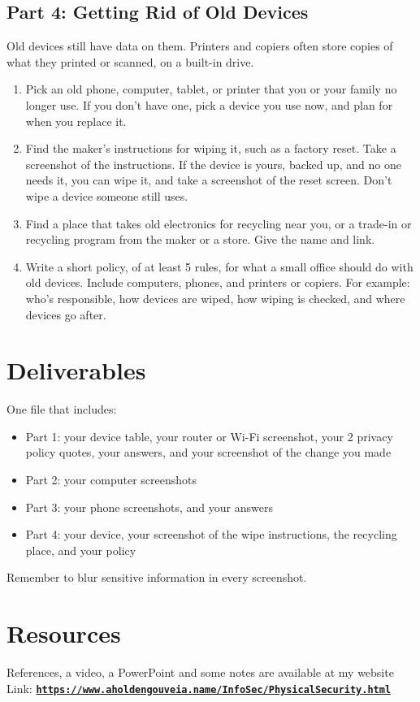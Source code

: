 \documentclass[12pt]{article}
\begin{document}
\subsection*{Part 4: Getting Rid of Old Devices}
Old devices still have data on them. Printers and copiers often store copies of what they printed or scanned, on a built-in drive.
\begin{enumerate}[start=9]
    \item Pick an old phone, computer, tablet, or printer that you or your family no longer use. If you don't have one, pick a device you use now, and plan for when you replace it.
    \item Find the maker's instructions for wiping it, such as a factory reset. Take a screenshot of the instructions. If the device is yours, backed up, and no one needs it, you can wipe it, and take a screenshot of the reset screen. Don't wipe a device someone still uses.
    \item Find a place that takes old electronics for recycling near you, or a trade-in or recycling program from the maker or a store. Give the name and link.
    \item Write a short policy, of at least 5 rules, for what a small office should do with old devices. Include computers, phones, and printers or copiers. For example: who's responsible, how devices are wiped, how wiping is checked, and where devices go after.
\end{enumerate}

\section*{Deliverables}
One file that includes:
\begin{itemize}
    \item Part 1: your device table, your router or Wi-Fi screenshot, your 2 privacy policy quotes, your answers, and your screenshot of the change you made
    \item Part 2: your computer screenshots
    \item Part 3: your phone screenshots, and your answers
    \item Part 4: your device, your screenshot of the wipe instructions, the recycling place, and your policy
\end{itemize}
Remember to blur sensitive information in every screenshot.

\section*{Resources}
References, a video, a PowerPoint and some notes are available at my website
Link: \href{https://www.aholdengouveia.name/InfoSec/PhysicalSecurity.html}{\textbf{\nolinkurl{https://www.aholdengouveia.name/InfoSec/PhysicalSecurity.html}}}
\end{document}
